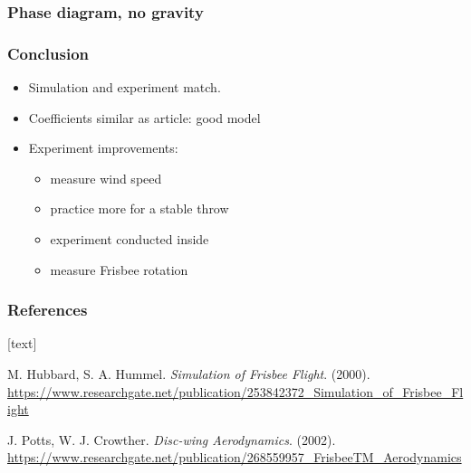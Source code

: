 \documentclass{beamer}
\begin{document}

\begin{frame}

\frametitle{Phase diagram, no gravity}


\end{frame}


\begin{frame}

\frametitle{Conclusion}

\begin{itemize}
\item Simulation and experiment match.
\item Coefficients similar as article: good model
\item Experiment improvements:

\begin{itemize}
\item measure wind speed 
\item practice more for a stable throw
\item experiment conducted inside
\item measure Frisbee rotation
\end{itemize}

\end{itemize}

\end{frame}


\begin{frame}

\frametitle{References}

[text]

\begin{thebibliography}{9}

M. Hubbard, S. A. Hummel. \textit{Simulation of Frisbee Flight}. (2000). \url{https://www.researchgate.net/publication/253842372_Simulation_of_Frisbee_Flight}

J. Potts, W. J. Crowther. \textit{Disc-wing Aerodynamics}. (2002). \url{https://www.researchgate.net/publication/268559957_FrisbeeTM_Aerodynamics}

\end{thebibliography}

\end{frame}

\end{document}
